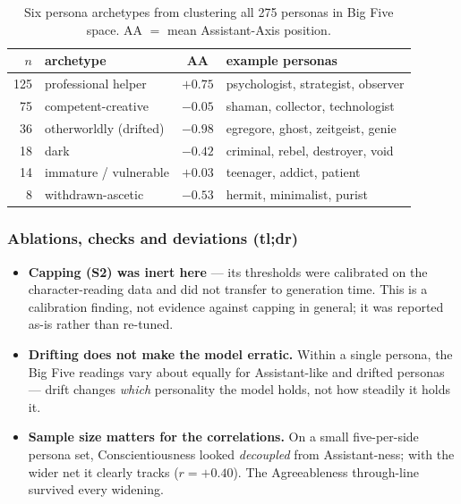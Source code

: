 \documentclass[11pt]{article}
\begin{document}
\begin{table}[h]
\centering\small
\caption{Six persona archetypes from clustering all 275 personas in Big Five
space. AA $=$ mean Assistant-Axis position.}
\label{tab:bf-atlas}
\begin{tabular}{rlcl}
\toprule
$n$ & archetype & AA & example personas \\
\midrule
125 & professional helper   & $+0.75$ & psychologist, strategist, observer \\
75  & competent-creative    & $-0.05$ & shaman, collector, technologist \\
36  & otherworldly (drifted)& $-0.98$ & egregore, ghost, zeitgeist, genie \\
18  & dark                  & $-0.42$ & criminal, rebel, destroyer, void \\
14  & immature / vulnerable & $+0.03$ & teenager, addict, patient \\
8   & withdrawn-ascetic     & $-0.53$ & hermit, minimalist, purist \\
\bottomrule
\end{tabular}
\end{table}

\subsubsection{Ablations, checks and deviations (tl;dr)}

\begin{itemize}
  \item \textbf{Capping (S2) was inert here} --- its thresholds were calibrated
        on the character-reading data and did not transfer to generation time.
        This is a calibration finding, not evidence against capping in general;
        it was reported as-is rather than re-tuned.
  \item \textbf{Drifting does not make the model erratic.} Within a single
        persona, the Big Five readings vary about equally for Assistant-like and
        drifted personas --- drift changes \emph{which} personality the model
        holds, not how steadily it holds it.
  \item \textbf{Sample size matters for the correlations.} On a small
        five-per-side persona set, Conscientiousness looked \emph{decoupled} from
        Assistant-ness; with the wider net it clearly tracks ($r = +0.40$). The
        Agreeableness through-line survived every widening.
\end{itemize}
\end{document}
